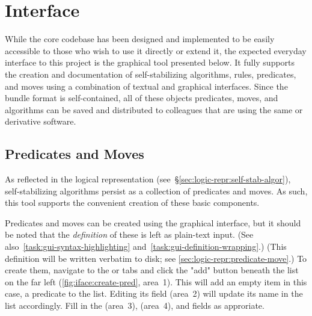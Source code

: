 \section{Interface}
\label{sec:interface-ssa}

While the core codebase has been designed and implemented
  to be easily accessible to those who wish to use it directly or extend it,
  the expected everyday interface to this project is
  the graphical tool presented below.
It fully supports the creation and documentation of
  self-stabilizing algorithms,
  rules,
  predicates,
  and moves
  using a combination of textual and graphical interfaces.
Since the bundle format is self-contained,
  all of these objects \Dash
  predicates, moves, and algorithms \Dash
  can be saved and distributed to colleagues
  that are using the same or derivative software.

\subsection{Predicates and Moves}
As reflected in the logical representation
  (see~\S\ref{sec:logic-repr:self-stab-algor}),
  self-stabilizing algorithms persist as a collection
  of predicates and moves.
As such, this tool supports the convenient creation of these basic components.

Predicates and moves can be created using the graphical interface,
  but it should be noted that the \emph{definition} of these is left
  as plain-text input.
(See also~\autoref{task:gui-syntax-highlighting} and~\autoref{task:gui-definition-wrapping}.)
(This definition will be written verbatim to disk;
  see \autoref{sec:logic-repr:predicate-move}.)
To create them, navigate to the  or  tabs
  and click the "add" button beneath the list on the far left
  (\autoref{fig:iface:create-pred}, area~1).
This will add an empty item \Dash in this case, a predicate \Dash to the list.
Editing its  field (area~2) will update its name in the list accordingly.
Fill in the  (area~3),  (area~4),
  and \ifacefield{\TeX} fields as approriate.

